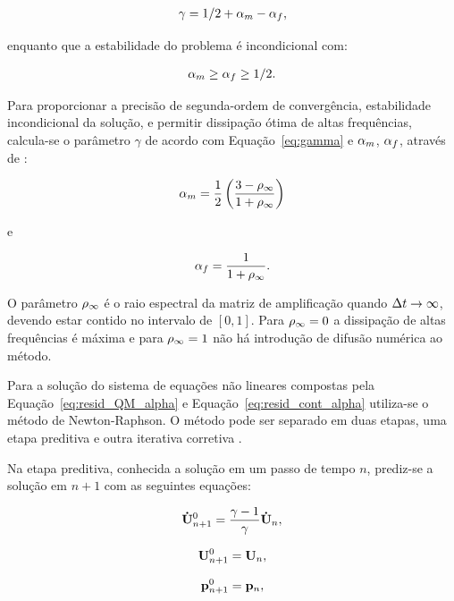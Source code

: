 \begin{gather}
\gamma = 1/2 + \alpha_m - \alpha_f,\label{eq:gamma}
\end{gather}

\noindent enquanto que a estabilidade do problema é incondicional com:

\begin{gather}
\alpha_m \ge \alpha_f \ge 1/2.
\end{gather}

Para proporcionar a precisão de segunda-ordem de convergência, estabilidade incondicional da solução, e permitir dissipação ótima de altas frequências, calcula-se o parâmetro $\gamma$ de acordo com Equação~\eqref{eq:gamma} e $\alpha_m$, $\alpha_f$, através de \cite{Hughes:2000}:

\begin{gather}
\alpha_m = \frac{1}{2}\left(\frac{3 - \rho_\infty}{1+\rho_\infty}\right)\label{eq:alpha_m}
\end{gather}

\noindent e

\begin{gather}
\alpha_f = \frac{1}{1+\rho_\infty}\label{eq:alpha_f}.
\end{gather}

O parâmetro $\rho_\infty$ é o raio espectral da matriz de amplificação quando $\Delta t \rightarrow \infty$, devendo estar contido no intervalo de $[0,1]$. Para $\rho_\infty = 0$ a dissipação de altas frequências é máxima e para $\rho_\infty = 1$ não há introdução de difusão numérica ao método.

Para a solução do sistema de equações não lineares compostas pela Equação~\eqref{eq:resid_QM_alpha} e Equação~\eqref{eq:resid_cont_alpha} utiliza-se o método de Newton-Raphson. O método pode ser separado em duas etapas, uma etapa preditiva e outra iterativa corretiva \cite{BazilevsTT:2013a}.

Na etapa preditiva, conhecida a solução em um passo de tempo $n$, prediz-se a solução em $n+1$ com as seguintes equações:

\begin{align}
\mathbf{\dot{U}}_{n+1}^{0} = \frac{\gamma-1}{\gamma}\mathbf{\dot{U}}_{n} \label{eq:pred_acel},
\end{align}

\begin{align}
\mathbf{U}_{n+1}^{0} = \mathbf{U}_{n}, \label{eq:pred_vel}
\end{align}

\begin{align}
\mathbf{p}_{n+1}^{0} = \mathbf{p}_{n},\label{eq:pred_press}
\end{align}

